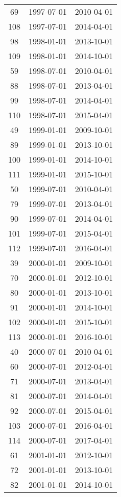 % 
\begin{tabular}{ccc}
  \hline
  \hline
69 & 1997-07-01 & 2010-04-01 \\ 
  108 & 1997-07-01 & 2014-04-01 \\ 
  98 & 1998-01-01 & 2013-10-01 \\ 
  109 & 1998-01-01 & 2014-10-01 \\ 
  59 & 1998-07-01 & 2010-04-01 \\ 
  88 & 1998-07-01 & 2013-04-01 \\ 
  99 & 1998-07-01 & 2014-04-01 \\ 
  110 & 1998-07-01 & 2015-04-01 \\ 
  49 & 1999-01-01 & 2009-10-01 \\ 
  89 & 1999-01-01 & 2013-10-01 \\ 
  100 & 1999-01-01 & 2014-10-01 \\ 
  111 & 1999-01-01 & 2015-10-01 \\ 
  50 & 1999-07-01 & 2010-04-01 \\ 
  79 & 1999-07-01 & 2013-04-01 \\ 
  90 & 1999-07-01 & 2014-04-01 \\ 
  101 & 1999-07-01 & 2015-04-01 \\ 
  112 & 1999-07-01 & 2016-04-01 \\ 
  39 & 2000-01-01 & 2009-10-01 \\ 
  70 & 2000-01-01 & 2012-10-01 \\ 
  80 & 2000-01-01 & 2013-10-01 \\ 
  91 & 2000-01-01 & 2014-10-01 \\ 
  102 & 2000-01-01 & 2015-10-01 \\ 
  113 & 2000-01-01 & 2016-10-01 \\ 
  40 & 2000-07-01 & 2010-04-01 \\ 
  60 & 2000-07-01 & 2012-04-01 \\ 
  71 & 2000-07-01 & 2013-04-01 \\ 
  81 & 2000-07-01 & 2014-04-01 \\ 
  92 & 2000-07-01 & 2015-04-01 \\ 
  103 & 2000-07-01 & 2016-04-01 \\ 
  114 & 2000-07-01 & 2017-04-01 \\ 
  61 & 2001-01-01 & 2012-10-01 \\ 
  72 & 2001-01-01 & 2013-10-01 \\ 
  82 & 2001-01-01 & 2014-10-01 \\ 

\end{tabular}
